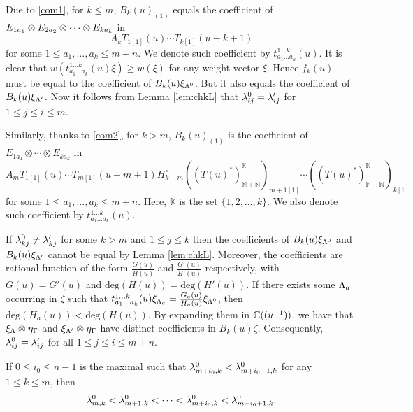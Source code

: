 \documentclass[12pt]{amsart}
\begin{document}
Due to \eqref{com1}, for $k\leq m$, $B_k(u)_{(1)}$ equals the coefficient of $E_{1a_1}\otimes E_{2a_2}\otimes\cdots\otimes E_{ka_k}$ in
\[
A_kT_{1[1]}(u)\cdots T_{k[1]}(u-k+1)
\]
for some $1\leq a_1,\ldots,a_k\leq m+n$. We denote such coefficient by $t_{a_1\ldots a_k}^{1 \ldots k}(u)$.
It is clear that $w(t_{a_1\ldots a_k}^{1 \ldots k}(u)\xi)\geq w(\xi)$ for any weight vector $\xi$.
Hence $f_k(u)$ must be equal to the coefficient of $B_k(u)\xi_{\Lambda^0}$. But it also equals the coefficient of $B_k(u)\xi_{\Lambda'}$. Now it follows from Lemma \ref{lem:chkL} that $\lambda^0_{ij}=\lambda'_{ij}$ for $1\leq j\leq i\leq m$.

Similarly, thanks to \eqref{com2}, for $k>m$, $B_k(u)_{(1)}$ is the coefficient of $E_{1a_1}\otimes\cdots\otimes E_{ka_k}$ in
\[
A_mT_{1[1]}(u)\cdots T_{m[1]}(u-m+1)H_{k-m}^{\circ}((T(u)^*)^{\mathbb{K}}_{\mathbb{M}+\mathbb{N}})_{m+1[1]}\cdots ((T(u)^*)^{\mathbb{K}}_{\mathbb{M}+\mathbb{N}})_{k[1]}
\]
for some $1\leq a_1,\ldots,a_k\leq m+n$. Here, $\mathbb{K}$ is the set $\{1,2,\ldots,k\}$. We also denote such coefficient by $t_{a_1\ldots a_k}^{1 \ldots k}(u)$.


If  $\lambda^0_{kj}\neq \lambda'_{kj}$ for some $k>m$ and $1\leq j\leq k$ then the coefficients of $B_k(u)\xi_{\Lambda^0}$ and $B_k(u)\xi_{\Lambda'}$ cannot be equal by Lemma \ref{lem:chkL}. Moreover, the coefficients are rational function of the form $\frac{G(u)}{H(u)}$ and $\frac{G'(u)}{H'(u)}$ respectively, with $G(u)=G'(u)$ and $\text{deg}(H(u))=\text{deg}(H'(u))$.
If there exists some $\Lambda_a$ occurring in $\zeta$ such that $t_{a_1\ldots a_k}^{1 \ldots k}(u)\xi_{\Lambda_a}=\frac{G_a(u)}{H_a(u)}\xi_{\Lambda^0}$, then $\text{deg}(H_a(u))<\text{deg}(H(u))$. By expanding them in $\mathbb{C}((u^{-1}))$, we have that
$\xi_{\Lambda}\otimes\eta_{\Gamma}$ and $\xi_{\Lambda'}\otimes\eta_{\Gamma}$ have  distinct coefficients in $B_k(u)\zeta$.
Consequently, $\lambda^0_{ij}=\lambda'_{ij}$ for all $1\leq j\leq i\leq m+n$.

\epf

\ble\label{lem:luc}
If $0\leq i_0\leq n-1$ is the maximal such that $\lambda_{m+i_0,k}^{0}<\lambda_{m+i_0+1,k}^{0}$ for any $1\leq k\leq m$, then
\[
\lambda_{m,k}^{0}<\lambda_{m+1,k}^{0}<\cdots<\lambda_{m+i_0,k}^{0}<\lambda_{m+i_0+1,k}^{0}.
\]
\ele
\end{document}
